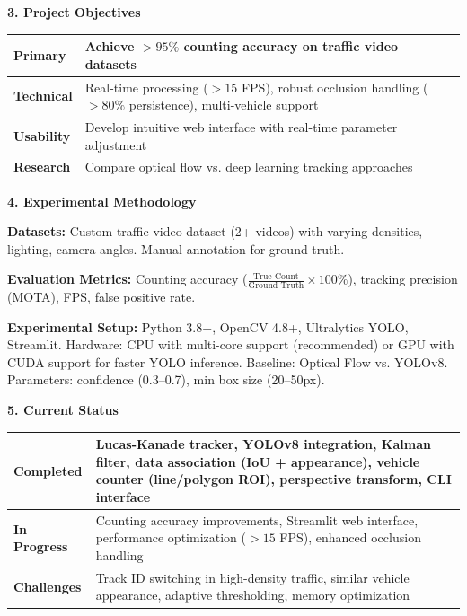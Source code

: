 \documentclass[8pt,a4paper]{article}
\begin{document}
\vspace{0.1cm}
\noindent\textbf{3. Project Objectives}

\vspace{-0.1cm}
\begin{table}[h]
\centering
\small
\begin{tabular}{|p{2cm}|p{10.5cm}|}
\hline
\textbf{Primary} & Achieve $>95\%$ counting accuracy on traffic video datasets \\
\hline
\textbf{Technical} & Real-time processing ($>15$ FPS), robust occlusion handling ($>80\%$ persistence), multi-vehicle support \\
\hline
\textbf{Usability} & Develop intuitive web interface with real-time parameter adjustment \\
\hline
\textbf{Research} & Compare optical flow vs. deep learning tracking approaches \\
\hline
\end{tabular}
\end{table}

\vspace{0.1cm}
\noindent\textbf{4. Experimental Methodology}

\vspace{0.15cm}
\noindent\textbf{Datasets:} Custom traffic video dataset (2+ videos) with varying densities, lighting, camera angles. Manual annotation for ground truth.

\noindent\textbf{Evaluation Metrics:} Counting accuracy ($\frac{\text{True Count}}{\text{Ground Truth}} \times 100\%$), tracking precision (MOTA), FPS, false positive rate.

\noindent\textbf{Experimental Setup:} Python 3.8+, OpenCV 4.8+, Ultralytics YOLO, Streamlit. Hardware: CPU with multi-core support (recommended) or GPU with CUDA support for faster YOLO inference. Baseline: Optical Flow vs. YOLOv8. Parameters: confidence (0.3--0.7), min box size (20--50px).

\vspace{0.1cm}
\noindent\textbf{5. Current Status}

\vspace{0.15cm}
\begin{table}[h]
\centering
\small
\begin{tabular}{|p{2cm}|p{10.5cm}|}
\hline
\textbf{Completed} & Lucas-Kanade tracker, YOLOv8 integration, Kalman filter, data association (IoU + appearance), vehicle counter (line/polygon ROI), perspective transform, CLI interface \\
\hline
\textbf{In Progress} & Counting accuracy improvements, Streamlit web interface, performance optimization ($>15$ FPS), enhanced occlusion handling \\
\hline
\textbf{Challenges} & Track ID switching in high-density traffic, similar vehicle appearance, adaptive thresholding, memory optimization \\
\hline
\end{tabular}
\end{table}
\end{document}
